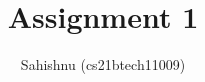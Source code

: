 \documentclass[journal,12pt,twocolumn]{IEEEtran}
\begin{document}
\let\vec\mathbf
\def\putbox#1#2#3{\makebox[0in][l]{\makebox[#1][l]{}\raisebox{\baselineskip}[0in][0in]{\raisebox{#2}[0in][0in]{#3}}}}
     \def\rightbox#1{\makebox[0in][r]{#1}}
     \def\centbox#1{\makebox[0in]{#1}}
     \def\topbox#1{\raisebox{-\baselineskip}[0in][0in]{#1}}
     \def\midbox#1{\raisebox{-0.5\baselineskip}[0in][0in]{#1}}
\title{
	Assignment 1
}
\author{ Sahishnu (cs21btech11009)%
}
%
%
%
% 
%
\end{document}
